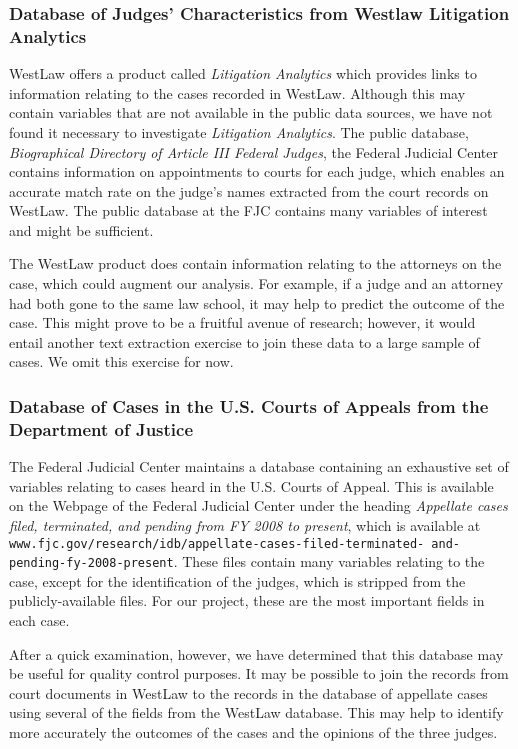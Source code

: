 \documentclass[11pt]{paper}
\begin{document}
\subsubsection{Database of Judges' Characteristics 
	from Westlaw Litigation Analytics}

WestLaw offers a product called {\it Litigation Analytics}
which provides links to information relating to the cases recorded in WestLaw. 
Although this may contain variables that are not available in the public data sources, we have not found it necessary to investigate {\it Litigation Analytics}.
The public database, 
{\it Biographical Directory of Article III Federal Judges}, 
the Federal Judicial Center contains information
on appointments to courts for each judge, 
which enables an accurate match rate on the judge's names extracted from the court records on WestLaw. 
The public database at the FJC contains many variables of interest
and might be sufficient.

The WestLaw product does contain information relating to the attorneys on the case, which could augment our analysis. 
For example, if a judge and an attorney had both gone to the same law school, 
it may help to predict the outcome of the case. 
This might prove to be a fruitful avenue of research; 
however, it would entail another text extraction exercise to join these data
to a large sample of cases. 
We omit this exercise for now. 



\subsubsection{Database of Cases in the U.S. Courts of Appeals 
	from the Department of Justice} \label{sec:FJC_appeals}

The Federal Judicial Center maintains a database containing an
exhaustive set of variables relating to cases heard in the U.S. Courts of Appeal. 
This is available on the Webpage 
of the Federal Judicial Center under the heading
{\it Appellate cases filed, terminated, and pending from FY 2008 to present}, 
which is available at 
\texttt{www.fjc.gov/research/idb/appellate-cases-filed-terminated-
and-pending-fy-2008-present}.
These files contain many variables relating to the case, except for
the identification of the judges, which is stripped from the publicly-available files. 
For our project, these are the most important fields in each case. 

After a quick examination, however, we have determined that this database may be useful
for quality control purposes.
It may be possible to join the records from court documents in WestLaw
to the records in the database of appellate cases using several of
the fields from the WestLaw database. 
This may help to identify more accurately the outcomes of the cases and the opinions of the three judges.
\end{document}
